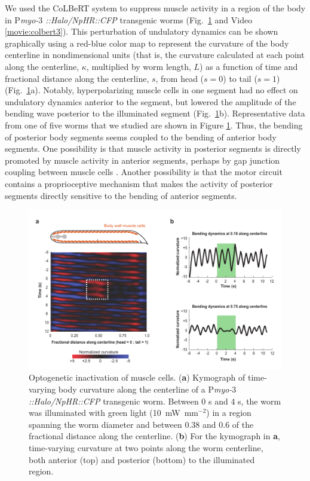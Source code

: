 We used the CoLBeRT system to suppress muscle activity in a region of the body in P\textit{myo-$3$ ::Halo/NpHR::CFP} transgenic worms (Fig.~\ref{fig:colbert2} and Video \ref{movie:colbert3}). This perturbation of undulatory dynamics can be shown graphically using a red-blue color map to represent the curvature of the body centerline in nondimensional units (that is, the curvature calculated at each point along the centerline, $\kappa$, multiplied by worm length, $L$) as a function of time and fractional distance along the centerline, $s$, from head ($s = 0$) to tail ($s = 1$) (Fig.~\ref{fig:colbert2}a). Notably, hyperpolarizing muscle cells in one segment had no effect on undulatory dynamics anterior to the segment, but lowered the amplitude of the bending wave posterior to the illuminated segment (Fig.~\ref{fig:colbert2}b). Representative data from one of five worms that we studied are shown in Figure \ref{fig:colbert2}. Thus, the bending of posterior body segments seems coupled to the bending of anterior body segments. One possibility is that muscle activity in posterior segments is directly promoted by muscle activity in anterior segments, perhaps by gap junction coupling between muscle cells \citep{liu_low_2006}. Another possibility is that the motor circuit contains a proprioceptive mechanism that makes the activity of posterior segments directly sensitive to the bending of anterior segments.

\begin{figure} 
\includegraphics[width=\textwidth]{figures/colbert2}
\caption[Optogenetic inactivation of muscle cells.]{Optogenetic inactivation of muscle cells. (\textbf{a}) Kymograph of time-varying body curvature along the centerline of a P\textit{myo-$3$::Halo/NpHR::CFP} transgenic worm. Between 0 s and 4 s, the worm was illuminated with green light (10~mW~mm$^{-2}$) in a region spanning the worm diameter and between 0.38 and 0.6 of the fractional distance along the centerline. (\textbf{b}) For the kymograph in \textbf{a}, time-varying curvature at two points along the worm centerline, both anterior (top) and posterior (bottom) to the illuminated region. \label{fig:colbert2}}
\end{figure}


